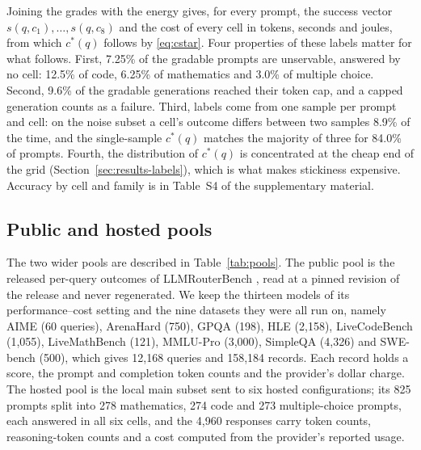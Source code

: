 \documentclass[final,5p,times,twocolumn]{elsarticle}
\theoremstyle{plain}
\newcommand{\cstar}{c^{*}}
\begin{document}
Joining the grades with the energy gives, for every prompt, the success
vector $s(q, c_1), \dots, s(q, c_8)$ and the cost of every cell in tokens,
seconds and joules, from which $\cstar(q)$ follows by \eqref{eq:cstar}. Four
properties of these labels matter for what follows. First, 7.25\% of the
gradable prompts are unservable, answered by no cell: 12.5\% of code, 6.25\%
of mathematics and 3.0\% of multiple choice. Second, 9.6\% of the gradable
generations reached their token cap, and a capped generation counts as a
failure. Third, labels come from one sample per prompt and cell: on the noise
subset a cell's outcome differs between two samples 8.9\% of the time, and
the single-sample $\cstar(q)$ matches the majority of three for 84.0\% of
prompts. Fourth, the distribution of $\cstar(q)$ is concentrated at the cheap
end of the grid (Section~\ref{sec:results-labels}), which is what makes
stickiness expensive. Accuracy by cell and family is in Table~S4 of the
supplementary material.

\subsection{Public and hosted pools}
\label{sec:data-pools}

The two wider pools are described in Table~\ref{tab:pools}. The public pool
is the released per-query outcomes of LLMRouterBench
\cite{li2026llmrouterbench}, read at a pinned revision of the release and
never regenerated. We keep the thirteen models of its performance--cost
setting and the nine datasets they were all run on, namely AIME (60
queries), ArenaHard (750), GPQA (198), HLE (2{,}158), LiveCodeBench
(1{,}055), LiveMathBench (121), MMLU-Pro (3{,}000), SimpleQA (4{,}326) and
SWE-bench (500), which gives 12{,}168 queries and 158{,}184 records. Each
record holds a score, the prompt and completion token counts and the
provider's dollar charge. The hosted pool is the local main subset sent to
six hosted configurations; its 825 prompts split into 278 mathematics, 274
code and 273 multiple-choice prompts, each answered in all six cells, and the
4{,}960 responses carry token counts, reasoning-token counts and a cost
computed from the provider's reported usage.
\end{document}
